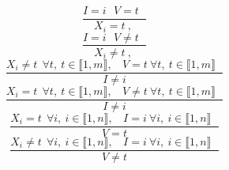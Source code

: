 $$\frac{I=i ~~~V=t ~~~}{X_{i}=t~,~}$$ $$\frac{I=i ~~~V \neq t ~~~}{X_{i} \neq t~,~}$$ $$\frac{X_{i} \neq t~~\forall t,~t \in \llbracket1,m\rrbracket,~~~~V=t ~\forall t,~t \in \llbracket1,m\rrbracket~~~}{I \neq i }$$ $$\frac{X_{i}=t~~\forall t,~t \in \llbracket1,m\rrbracket,~~~~V \neq t ~\forall t,~t \in \llbracket1,m\rrbracket~~~}{I \neq i }$$ $$\frac{X_{i}=t~~\forall i,~i \in \llbracket1,n\rrbracket,~~~~I=i ~\forall i,~i \in \llbracket1,n\rrbracket~~~}{V=t }$$ $$\frac{X_{i} \neq t~~\forall i,~i \in \llbracket1,n\rrbracket,~~~~I=i ~\forall i,~i \in \llbracket1,n\rrbracket~~~}{V \neq t }$$ 